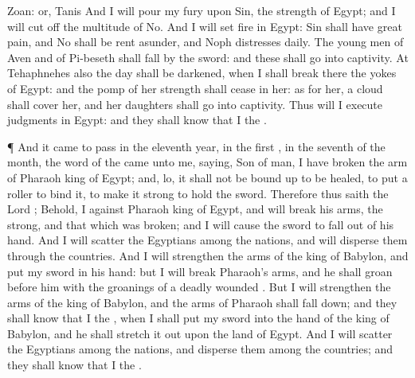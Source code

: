 {{Zoan: or, Tanis}
And I will
pour my
fury upon
Sin, the
strength of
Egypt; and I will cut
off the
multitude of
No.
And I will
set
fire in
Egypt:
Sin shall have
great
pain, and
No shall be rent
asunder, and
Noph
{}
distresses
daily.
The young
men of
Aven and of
Pi-beseth shall
fall by the
sword: and these
{} shall
go into
captivity.
At
Tehaphnehes also the
day shall be
darkened, when I shall
break there the
yokes of
Egypt: and the
pomp of her
strength shall
cease in
her: as for her, a
cloud shall
cover her, and her
daughters shall
go into
captivity.
Thus will I
execute
judgments in
Egypt: and they shall
know that I
{} the
{}.
\par }{\PP {}¶ And it came to pass in the
eleventh
year, in the
first
{}, in the
seventh
{} of the
month,
{} the
word of the
{} came unto me,
saying,
Son of
man, I have
broken the
arm of
Pharaoh
king of
Egypt; and, lo, it shall not be bound
up to be
healed, to
put a
roller to
bind it, to make it
strong to
hold the
sword.
Therefore thus
saith the
Lord
{}; Behold, I
{} against
Pharaoh
king of
Egypt, and will
break his
arms, the
strong, and that which was
broken; and I will cause the
sword to
fall out of his
hand.
And I will
scatter the
Egyptians among the
nations, and will
disperse them through the
countries.
And I will
strengthen the
arms of the
king of
Babylon, and
put my
sword in his
hand: but I will
break
Pharaoh’s
arms, and he shall
groan
before him with the
groanings of a deadly
wounded
{}.
But I will
strengthen the
arms of the
king of
Babylon, and the
arms of
Pharaoh shall fall
down; and they shall
know that I
{} the
{}, when I shall
put my
sword into the
hand of the
king of
Babylon, and he shall stretch it
out upon the
land of
Egypt.
And I will
scatter the
Egyptians among the
nations, and
disperse them among the
countries; and they shall
know that I
{} the
{}.

}
